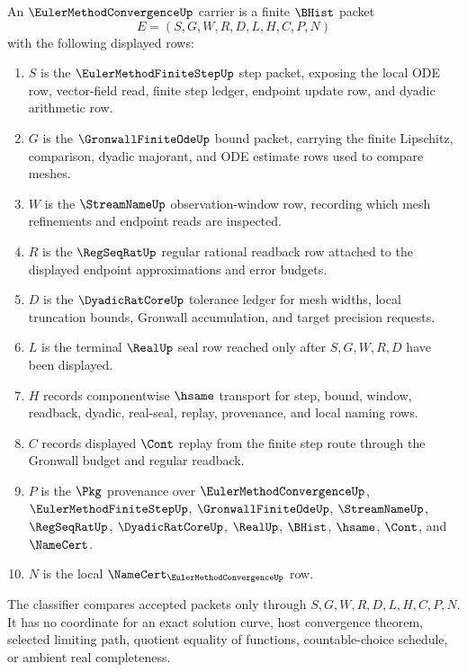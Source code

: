 \begin{definition}
\label{def:euler-method-convergence-carrier}
An $\EulerMethodConvergenceUp$ carrier is a finite $\BHist$ packet
$$
E=(S,G,W,R,D,L,H,C,P,N)
$$
with the following displayed rows:
\begin{enumerate}
\item $S$ is the $\EulerMethodFiniteStepUp$ step packet, exposing the local ODE row, vector-field read, finite step ledger, endpoint update row, and dyadic arithmetic row.
\item $G$ is the $\GronwallFiniteOdeUp$ bound packet, carrying the finite Lipschitz, comparison, dyadic majorant, and ODE estimate rows used to compare meshes.
\item $W$ is the $\StreamNameUp$ observation-window row, recording which mesh refinements and endpoint reads are inspected.
\item $R$ is the $\RegSeqRatUp$ regular rational readback row attached to the displayed endpoint approximations and error budgets.
\item $D$ is the $\DyadicRatCoreUp$ tolerance ledger for mesh widths, local truncation bounds, Gronwall accumulation, and target precision requests.
\item $L$ is the terminal $\RealUp$ seal row reached only after $S,G,W,R,D$ have been displayed.
\item $H$ records componentwise $\hsame$ transport for step, bound, window, readback, dyadic, real-seal, replay, provenance, and local naming rows.
\item $C$ records displayed $\Cont$ replay from the finite step route through the Gronwall budget and regular readback.
\item $P$ is the $\Pkg$ provenance over $\EulerMethodConvergenceUp$, $\EulerMethodFiniteStepUp$, $\GronwallFiniteOdeUp$, $\StreamNameUp$, $\RegSeqRatUp$, $\DyadicRatCoreUp$, $\RealUp$, $\BHist$, $\hsame$, $\Cont$, and $\NameCert$.
\item $N$ is the local $\NameCert_{\EulerMethodConvergenceUp}$ row.
\end{enumerate}
The classifier compares accepted packets only through $S,G,W,R,D,L,H,C,P,N$. It has no coordinate for an exact solution curve, host convergence theorem, selected limiting path, quotient equality of functions, countable-choice schedule, or ambient real completeness.
\end{definition}

